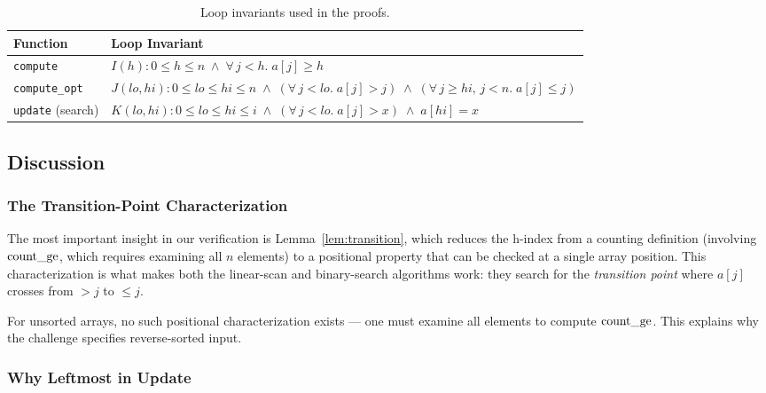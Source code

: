 \begin{table}[h]
\centering
\small
\begin{tabular}{@{}lp{10cm}@{}}
\toprule
\textbf{Function} & \textbf{Loop Invariant} \\
\midrule
\texttt{compute} &
$I(h): 0 \leq h \leq n \;\wedge\; \forall\, j < h.\; a[j] \geq h$ \\
\texttt{compute\_opt} &
$J(\mathit{lo},\mathit{hi}): 0 \leq \mathit{lo} \leq \mathit{hi} \leq n
\;\wedge\; (\forall\, j < \mathit{lo}.\; a[j] > j)
\;\wedge\; (\forall\, j \geq \mathit{hi},\, j < n.\; a[j] \leq j)$ \\
\texttt{update} (search) &
$K(\mathit{lo},\mathit{hi}): 0 \leq \mathit{lo} \leq \mathit{hi} \leq i
\;\wedge\; (\forall\, j < \mathit{lo}.\; a[j] > x)
\;\wedge\; a[\mathit{hi}] = x$ \\
\bottomrule
\end{tabular}
\caption{Loop invariants used in the proofs.}
\label{tab:invariants}
\end{table}

\subsection{Discussion}

\subsubsection{The Transition-Point Characterization}

The most important insight in our verification is Lemma~\ref{lem:transition}, which
reduces the h-index from a counting definition (involving $\operatorname{count\_ge}$, which requires
examining all $n$ elements) to a positional property that can be checked at a single
array position. This characterization is what makes both the linear-scan and
binary-search algorithms work: they search for the \emph{transition point}
where $a[j]$ crosses from $> j$ to $\leq j$.

For unsorted arrays, no such positional characterization exists --- one must examine
all elements to compute $\operatorname{count\_ge}$. This explains why the challenge specifies
reverse-sorted input.

\subsubsection{Why Leftmost in Update}

